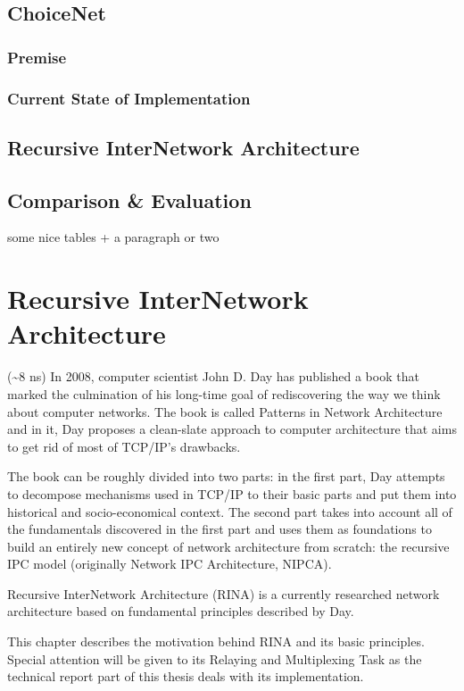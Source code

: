     \section{ChoiceNet}
        \subsection{Premise}
        \subsection{Current State of Implementation}

    \section{Recursive InterNetwork Architecture}


    \section{Comparison \& Evaluation}
        some nice tables + a paragraph or two


\chapter{Recursive InterNetwork Architecture}
    (\textasciitilde8 ns)
    In 2008, computer scientist John D. Day has published a book that marked the culmination of his long-time goal of rediscovering the way we think about computer networks. The book is called Patterns in Network Architecture and in it, Day proposes a clean-slate approach to computer architecture that aims to get rid of most of TCP/IP's drawbacks.

    The book can be roughly divided into two parts: in the first part, Day attempts to decompose mechanisms used in TCP/IP to their basic parts and put them into historical and socio-economical context. The second part takes into account all of the fundamentals discovered in the first part and uses them as foundations to build an entirely new concept of network architecture from scratch: the recursive IPC model (originally Network IPC Architecture, NIPCA).

    Recursive InterNetwork Architecture (RINA) is a currently researched network architecture based on fundamental principles described by Day.

    This chapter describes the motivation behind RINA and its basic principles. Special attention will be given to its Relaying and Multiplexing Task as the technical report part of this thesis deals with its implementation.

